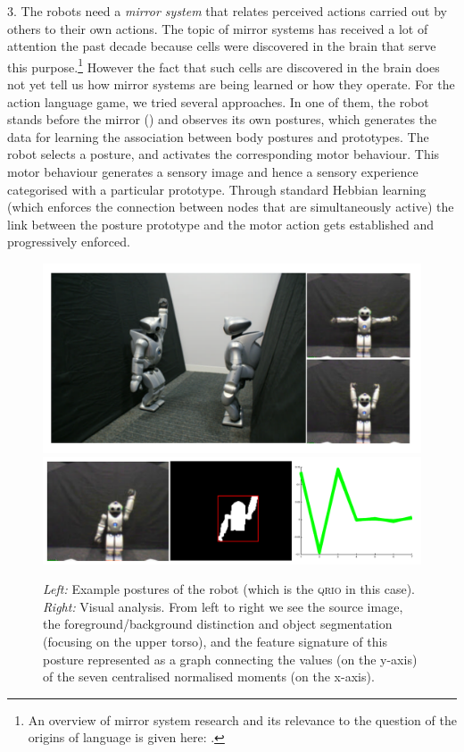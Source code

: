 3. The robots need a {\itshape mirror system} that relates perceived actions carried out by others to their own actions. 
The topic of mirror systems has received a lot of attention the past decade because cells were discovered in the brain 
that serve this purpose.\footnote{
An overview of mirror system research and its relevance to the question of the origins of language is given here: 
\cite{Rizzolatti:1998}.}
However the fact that such cells are discovered in the brain 
does not yet tell us how mirror systems are being learned or how they operate. For the action language game, we tried 
several approaches.
\enlargethispage{1\baselineskip}
In one of them, the robot stands before the mirror () and observes its own 
postures, which generates the data for learning the association between body postures and prototypes. 
The robot selects a posture, and activates the corresponding motor behaviour. This motor behaviour generates a sensory image and 
hence a sensory experience categorised with a particular prototype. Through standard Hebbian learning (which enforces the 
connection between nodes that are simultaneously active) the link between the posture prototype and the motor action gets 
established and progressively enforced. 
\clearpage
\begin{figure}[p]
\centerline{\includegraphics[width=0.2\linewidth]{chap11/figs/postures.pdf}\includegraphics[width=0.75\linewidth]{chap11/figs/vision_2.pdf}}
\caption{\label{vision}{\itshape Left:} Example postures of the robot (which is the \textsc{qrio} in this case).
{\itshape Right:} Visual analysis. From left to right we see the source image, the foreground/background distinction and object segmentation (focusing on the upper torso), and the feature signature of this posture represented as a graph connecting the values (on the y-axis)
of the seven centralised normalised moments (on the x-axis).}
\end{figure}

